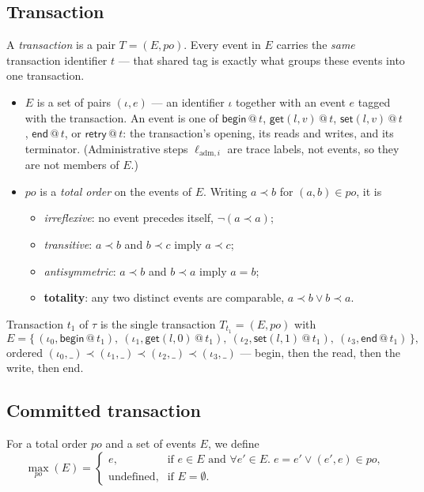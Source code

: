\documentclass[manuscript,nonacm]{acmart}
\makeatletter
\theoremstyle{acmdefinition}
\newcommand{\bbegin}{\textsf{begin}}
\newcommand{\eend}{\textsf{end}}
\newcommand{\retry}{\textsf{retry}}
\newcommand{\getev}[3]{\textsf{get}(#1,#2)\,@\,#3}
\newcommand{\setev}[3]{\textsf{set}(#1,#2)\,@\,#3}
\newcommand{\ladm}[1][]{\ell_{\mathrm{adm}#1}}       %
\newcommand{\po}{\mathit{po}}
\makeatother
\begin{document}
\subsection{Transaction}
\begin{definition}[Transaction]
A \emph{transaction} is a pair $T = (E,\po)$. Every event in $E$ carries the
\emph{same} transaction identifier $t$ --- that shared tag is exactly what groups
these events into one transaction.
\begin{itemize}
\item $E$ is a set of pairs $(\iota, e)$ --- an identifier $\iota$ together with an
event $e$ tagged with the transaction. An event is one of $\bbegin\,@\,t$,
$\getev{l}{v}{t}$, $\setev{l}{v}{t}$, $\eend\,@\,t$, or $\retry\,@\,t$: the
transaction's opening, its reads and writes, and its terminator. (Administrative
steps $\ladm[,i]$ are trace labels, not events, so they are not members of $E$.)
\item $\po$ is a \emph{total order} on the events of $E$. Writing $a \prec b$ for
$(a,b) \in \po$, it is
  \begin{itemize}
  \item \emph{irreflexive}: no event precedes itself, $\neg(a \prec a)$;
  \item \emph{transitive}: $a \prec b$ and $b \prec c$ imply $a \prec c$;
  \item \emph{antisymmetric}: $a \prec b$ and $b \prec a$ imply $a = b$;
  \item \textbf{totality}: any two distinct events are comparable, $a \prec b \vee b \prec a$.
  \end{itemize}
\end{itemize}
\end{definition}

\begin{example}
Transaction $t_1$ of $\tau$ is the single transaction $T_{t_1} = (E,\po)$ with
\[
E = \{\, (\iota_0, \bbegin\,@\,t_1),\ (\iota_1, \getev{l}{0}{t_1}),\
         (\iota_2, \setev{l}{1}{t_1}),\ (\iota_3, \eend\,@\,t_1) \,\},
\]
ordered $(\iota_0,\_) \prec (\iota_1,\_) \prec (\iota_2,\_) \prec (\iota_3,\_)$ ---
begin, then the read, then the write, then end.
\end{example}



\subsection{Committed transaction}
For a total order $\po$ and a set of events $E$, we define
\[
\operatorname{max}_{\po}(E) =
\begin{cases}
e, & \text{if } e \in E \text{ and } \forall e' \in E.\; e = e' \lor (e',e) \in \po,\\[0.8ex]
\text{undefined}, & \text{if } E = \emptyset.
\end{cases}
\]
\end{document}
